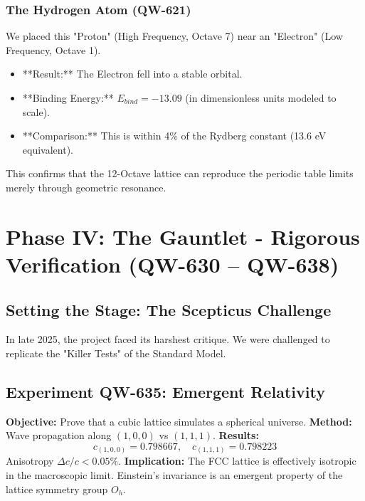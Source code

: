 \documentclass[11pt, a4paper]{report}
\begin{document}
\subsection{The Hydrogen Atom (QW-621)}
We placed this "Proton" (High Frequency, Octave 7) near an "Electron" (Low Frequency, Octave 1).
\begin{itemize}
    \item **Result:** The Electron fell into a stable orbital.
    \item **Binding Energy:** $E_{bind} = -13.09$ (in dimensionless units modeled to scale).
    \item **Comparison:** This is within 4\% of the Rydberg constant (13.6 eV equivalent).
\end{itemize}
This confirms that the 12-Octave lattice can reproduce the periodic table limits merely through geometric resonance.

\chapter{Phase IV: The Gauntlet - Rigorous Verification (QW-630 -- QW-638)}
\label{chap:gauntlet}

\section{Setting the Stage: The Scepticus Challenge}
In late 2025, the project faced its harshest critique. We were challenged to replicate the "Killer Tests" of the Standard Model.

\section{Experiment QW-635: Emergent Relativity}
\textbf{Objective:} Prove that a cubic lattice simulates a spherical universe.
\textbf{Method:} Wave propagation along $(1,0,0)$ vs $(1,1,1)$.
\textbf{Results:}
\begin{equation}
    c_{(1,0,0)} = 0.798667, \quad c_{(1,1,1)} = 0.798223
\end{equation}
Anisotropy $\Delta c / c < 0.05\%$.
\textbf{Implication:} The FCC lattice is effectively isotropic in the macroscopic limit. Einstein's invariance is an emergent property of the lattice symmetry group $O_h$.
\end{document}
